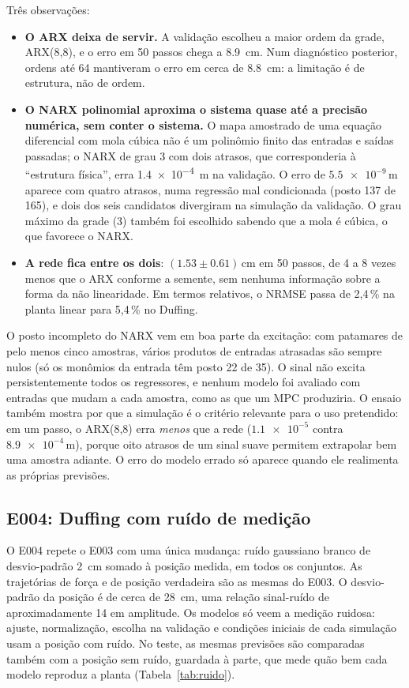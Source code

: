 \documentclass[11pt,a4paper]{article}
\begin{document}
Três observações:
\begin{itemize}\itemsep0pt
  \item \textbf{O ARX deixa de servir.} A validação escolheu a maior ordem da grade, ARX(8,8), e o erro
  em 50 passos chega a \SI{8,9}{cm}. Num diagnóstico posterior, ordens até 64 mantiveram o erro em
  cerca de \SI{8,8}{cm}: a limitação é de estrutura, não de ordem.
  \item \textbf{O NARX polinomial aproxima o sistema quase até a precisão numérica, sem conter o
  sistema.} O mapa amostrado de uma equação diferencial com mola cúbica não é um polinômio finito das
  entradas e saídas passadas; o NARX de grau 3 com dois atrasos, que corresponderia à ``estrutura
  física'', erra \SI{1,4e-4}{m} na validação. O erro de $\num{5.5e-9}$\,m aparece com quatro
  atrasos, numa regressão mal condicionada (posto 137 de 165), e dois dos seis candidatos divergiram
  na simulação da validação. O grau máximo da grade (3) também foi escolhido sabendo que a mola é
  cúbica, o que favorece o NARX.
  \item \textbf{A rede fica entre os dois}: $(\num{1.53}\pm\num{0.61})$\,cm em 50 passos, de 4 a 8
  vezes menos que o ARX conforme a semente, sem nenhuma informação sobre a forma da não linearidade.
  Em termos relativos, o NRMSE passa de 2,4\,\% na planta linear para 5,4\,\% no Duffing.
\end{itemize}
O posto incompleto do NARX vem em boa parte da excitação: com patamares de pelo menos cinco amostras,
vários produtos de entradas atrasadas são sempre nulos (só os monômios da entrada têm posto 22 de
35). O sinal não excita persistentemente todos os regressores, e nenhum modelo foi avaliado com
entradas que mudam a cada amostra, como as que um MPC produziria.
O ensaio também mostra por que a simulação é o critério relevante para o uso pretendido: em um passo, o ARX(8,8) erra
\emph{menos} que a rede ($\num{1.1e-5}$ contra $\num{8.9e-4}$\,m), porque oito atrasos de um sinal
suave permitem extrapolar bem uma amostra adiante. O erro do modelo errado só aparece quando ele
realimenta as próprias previsões.

\subsection{E004: Duffing com ruído de medição}

O E004 repete o E003 com uma única mudança: ruído gaussiano branco de desvio-padrão \SI{2}{cm} somado
à posição medida, em todos os conjuntos. As trajetórias de força e de posição verdadeira são as
mesmas do E003. O desvio-padrão da posição é de cerca de \SI{28}{cm}, uma relação sinal-ruído de
aproximadamente 14 em amplitude. Os modelos só veem a medição ruidosa: ajuste, normalização, escolha
na validação e condições iniciais de cada simulação usam a posição com ruído. No teste, as mesmas
previsões são comparadas também com a posição sem ruído, guardada à parte, que mede quão bem cada
modelo reproduz a planta (Tabela~\ref{tab:ruido}).
\end{document}
